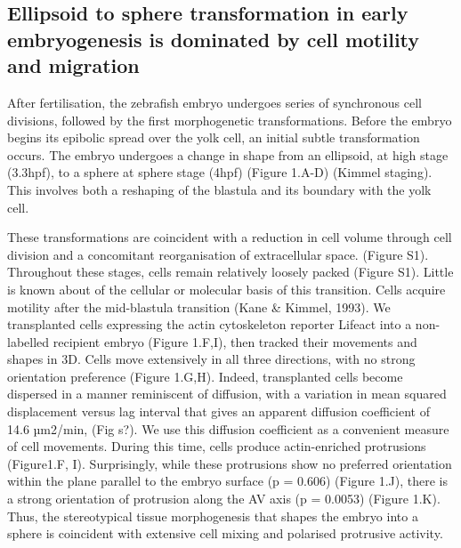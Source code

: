 \subsection{Ellipsoid to sphere transformation in early embryogenesis is dominated by cell motility and migration} %
After fertilisation, the zebrafish embryo undergoes series of synchronous cell divisions, followed by the first morphogenetic transformations.
Before the embryo begins its epibolic spread over the yolk cell, an initial subtle transformation occurs.
The embryo undergoes a change in shape from an ellipsoid, at high stage (3.3hpf), to a sphere at sphere stage (4hpf) (Figure 1.A-D) (Kimmel staging).
This involves both a reshaping of the blastula and its boundary with the yolk cell.

These transformations are coincident with a reduction in cell volume through cell division and a concomitant reorganisation of extracellular space. (Figure S1).
Throughout these stages, cells remain relatively loosely packed (Figure S1).
Little is known about of the cellular or molecular basis of this transition.
Cells acquire motility after the mid-blastula transition (Kane \& Kimmel, 1993).
We transplanted cells expressing the actin cytoskeleton reporter Lifeact into a non-labelled recipient embryo (Figure 1.F,I), then tracked their movements and shapes in 3D.
Cells move extensively in all three directions, with no strong orientation preference (Figure 1.G,H).
Indeed, transplanted cells become dispersed in a manner reminiscent of diffusion, with a variation in mean squared displacement versus lag interval that gives an apparent diffusion coefficient of 14.6 µm2/min, (Fig s?).
We use this diffusion coefficient as a convenient measure of cell movements.
During this time, cells produce actin-enriched protrusions (Figure1.F, I).
Surprisingly, while these protrusions show no preferred orientation within the plane parallel to the embryo surface (p = 0.606) (Figure 1.J), there is a strong orientation of protrusion along the AV axis (p = 0.0053) (Figure 1.K).
Thus, the stereotypical tissue morphogenesis that shapes the embryo into a sphere is coincident with extensive cell mixing and polarised protrusive activity.
